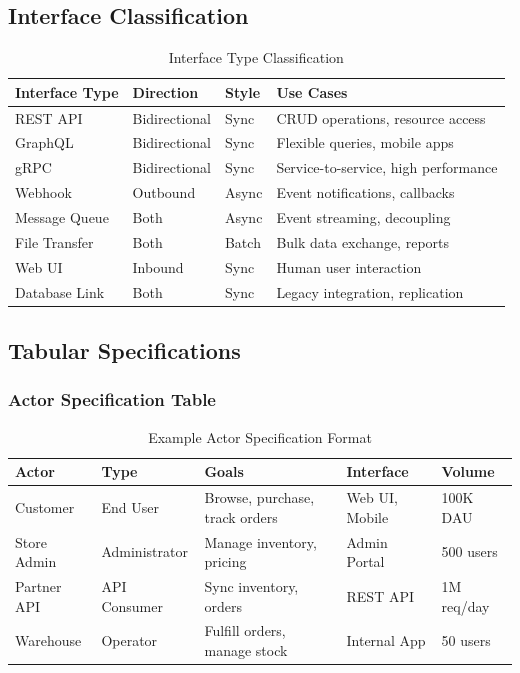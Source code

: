 \documentclass[11pt,letterpaper]{article}
\begin{document}
\subsection{Interface Classification}

\begin{table}[H]
\centering
\caption{Interface Type Classification}
\small
\begin{tabular}{@{}L{2.5cm}L{2cm}L{2.5cm}L{5.5cm}@{}}
\toprule
\textbf{Interface Type} & \textbf{Direction} & \textbf{Style} & \textbf{Use Cases} \\
\midrule
REST API & Bidirectional & Sync & CRUD operations, resource access \\
\addlinespace
GraphQL & Bidirectional & Sync & Flexible queries, mobile apps \\
\addlinespace
gRPC & Bidirectional & Sync & Service-to-service, high performance \\
\addlinespace
Webhook & Outbound & Async & Event notifications, callbacks \\
\addlinespace
Message Queue & Both & Async & Event streaming, decoupling \\
\addlinespace
File Transfer & Both & Batch & Bulk data exchange, reports \\
\addlinespace
Web UI & Inbound & Sync & Human user interaction \\
\addlinespace
Database Link & Both & Sync & Legacy integration, replication \\
\bottomrule
\end{tabular}
\end{table}

\subsection{Tabular Specifications}

\subsubsection{Actor Specification Table}

\begin{table}[H]
\centering
\caption{Example Actor Specification Format}
\small
\begin{tabular}{@{}L{2cm}L{2.2cm}L{3cm}L{2.5cm}L{2.5cm}@{}}
\toprule
\textbf{Actor} & \textbf{Type} & \textbf{Goals} & \textbf{Interface} & \textbf{Volume} \\
\midrule
Customer & End User & Browse, purchase, track orders & Web UI, Mobile & 100K DAU \\
Store Admin & Administrator & Manage inventory, pricing & Admin Portal & 500 users \\
Partner API & API Consumer & Sync inventory, orders & REST API & 1M req/day \\
Warehouse & Operator & Fulfill orders, manage stock & Internal App & 50 users \\
\bottomrule
\end{tabular}
\end{table}
\end{document}
